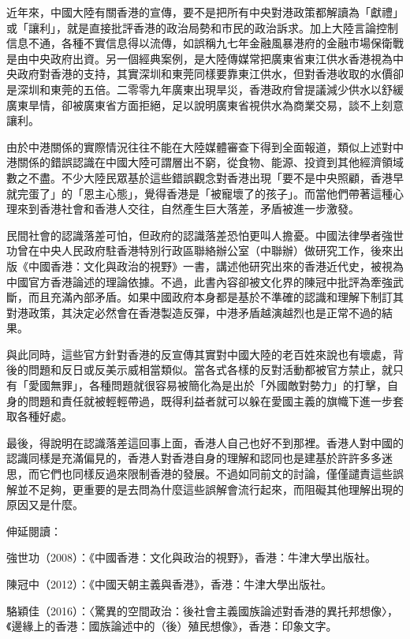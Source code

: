 近年來，中國大陸有關香港的宣傳，要不是把所有中央對港政策都解讀為「獻禮」或「讓利」，就是直接批評香港的政治局勢和市民的政治訴求。加上大陸言論控制信息不通，各種不實信息得以流傳，如誤稱九七年金融風暴港府的金融市場保衛戰是由中央政府出資。另一個經典案例，是大陸傳媒常把廣東省東江供水香港視為中央政府對香港的支持，其實深圳和東莞同樣要靠東江供水，但對香港收取的水價卻是深圳和東莞的五倍。二零零九年廣東出現旱災，香港政府曾提議減少供水以舒緩廣東旱情，卻被廣東省方面拒絕，足以說明廣東省視供水為商業交易，談不上刻意讓利。

由於中港關係的實際情況往往不能在大陸媒體審查下得到全面報道，類似上述對中港關係的錯誤認識在中國大陸可謂層出不窮，從食物、能源、投資到其他經濟領域數之不盡。不少大陸民眾基於這些錯誤觀念對香港出現「要不是中央照顧，香港早就完蛋了」的「恩主心態」，覺得香港是「被寵壞了的孩子」。而當他們帶著這種心理來到香港社會和香港人交往，自然產生巨大落差，矛盾被進一步激發。

民間社會的認識落差可怕，但政府的認識落差恐怕更叫人擔憂。中國法律學者強世功曾在中央人民政府駐香港特別行政區聯絡辦公室（中聯辦）做研究工作，後來出版《中國香港：文化與政治的視野》一書，講述他研究出來的香港近代史，被視為中國官方香港論述的理論依據。不過，此書內容卻被文化界的陳冠中批評為牽強武斷，而且充滿內部矛盾。如果中國政府本身都是基於不準確的認識和理解下制訂其對港政策，其決定必然會在香港製造反彈，中港矛盾越演越烈也是正常不過的結果。

與此同時，這些官方針對香港的反宣傳其實對中國大陸的老百姓來說也有壞處，背後的問題和反日或反美示威相當類似。當各式各樣的反對活動都被官方禁止，就只有「愛國無罪」，各種問題就很容易被簡化為是出於「外國敵對勢力」的打擊，自身的問題和責任就被輕輕帶過，既得利益者就可以躲在愛國主義的旗幟下進一步套取各種好處。

最後，得說明在認識落差這回事上面，香港人自己也好不到那裡。香港人對中國的認識同樣是充滿偏見的，香港人對香港自身的理解和認同也是建基於許許多多迷思，而它們也同樣反過來限制香港的發展。不過如同前文的討論，僅僅譴責這些誤解並不足夠，更重要的是去問為什麼這些誤解會流行起來，而阻礙其他理解出現的原因又是什麼。

伸延閱讀：

強世功（2008）：《中國香港：文化與政治的視野》，香港：牛津大學出版社。

陳冠中（2012）：《中國天朝主義與香港》，香港：牛津大學出版社。

駱穎佳（2016）：〈驚異的空間政治：後社會主義國族論述對香港的異托邦想像〉，《邊緣上的香港：國族論述中的（後）殖民想像》，香港：印象文字。